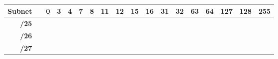 \documentclass[11pt,a4paper]{report}
\begin{document}
\begin{center}
\begin{longtable}{rlcccccccccccccccc}
                \multicolumn{1}{c}{\multirow{-2}{*}{\textbf{Subnet}}}                                                    &                       & \cellcolor[HTML]{C09FE5}0 & \cellcolor[HTML]{C09FE5}3 & \cellcolor[HTML]{C09FE5}4 & \cellcolor[HTML]{C09FE5}7 & \cellcolor[HTML]{C09FE5}8 & \cellcolor[HTML]{C09FE5}11 & \cellcolor[HTML]{C09FE5}12 & \cellcolor[HTML]{C09FE5}15 & \cellcolor[HTML]{BFBFBF}16      & \cellcolor[HTML]{BFBFBF}31      & \cellcolor[HTML]{FFD966}32      & \cellcolor[HTML]{FFD966}63      & \cellcolor[HTML]{A9D08E}64      & \cellcolor[HTML]{A9D08E}127     & \cellcolor[HTML]{F4B084}128      & \cellcolor[HTML]{F4B084}255     \\ \cline{1-1} \cline{3-18} 
                \endhead
                \cline{1-1} \cline{3-18}
                \endfoot
                \endlastfoot
                \textbf{/25}                                                                                             &                       &                           &                           &                           &                           &                           &                            &                            &                            &                                 &                                 &                                 &                                 &                                 &                                 & \cellcolor[HTML]{F4B084}         & \cellcolor[HTML]{F4B084}        \\
                \textbf{/26}                                                                                             &                       &                           &                           &                           &                           &                           &                            &                            &                            &                                 &                                 &                                 &                                 & \cellcolor[HTML]{A9D08E}        & \cellcolor[HTML]{A9D08E}        &                                  &                                 \\
                \textbf{/27}                                                                                             &                       &                           &                           &                           &                           &                           &                            &                            &                            &                                 &                                 & \cellcolor[HTML]{FFD966}        & \cellcolor[HTML]{FFD966}        &                                 &                                 &                                  &                                 \\

\end{longtable}
\end{center}
\end{document}
